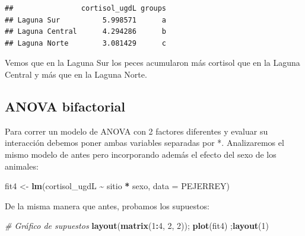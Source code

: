 \documentclass[
]{article}
\newenvironment{Shaded}{\begin{snugshade}}{\end{snugshade}}
\newcommand{\AttributeTok}[1]{\textcolor[rgb]{0.13,0.29,0.53}{#1}}
\newcommand{\CommentTok}[1]{\textcolor[rgb]{0.56,0.35,0.01}{\textit{#1}}}
\newcommand{\DecValTok}[1]{\textcolor[rgb]{0.00,0.00,0.81}{#1}}
\newcommand{\FunctionTok}[1]{\textcolor[rgb]{0.13,0.29,0.53}{\textbf{#1}}}
\newcommand{\NormalTok}[1]{#1}
\newcommand{\OtherTok}[1]{\textcolor[rgb]{0.56,0.35,0.01}{#1}}
\newcommand{\SpecialCharTok}[1]{\textcolor[rgb]{0.81,0.36,0.00}{\textbf{#1}}}
\newcommand{\StringTok}[1]{\textcolor[rgb]{0.31,0.60,0.02}{#1}}
\begin{document}
\begin{Shaded}
\end{Shaded}

\begin{verbatim}
##                cortisol_ugdL groups
## Laguna Sur          5.998571      a
## Laguna Central      4.294286      b
## Laguna Norte        3.081429      c
\end{verbatim}

Vemos que en la Laguna Sur los peces acumularon más cortisol que en la
Laguna Central y más que en la Laguna Norte.

\subsection{ANOVA bifactorial}\label{anova-bifactorial}

Para correr un modelo de ANOVA con 2 factores diferentes y evaluar su
interacción debemos poner ambas variables separadas por *. Analizaremos
el mismo modelo de antes pero incorporando además el efecto del sexo de
los animales:

\begin{Shaded}
\begin{Highlighting}[]
\NormalTok{fit4 }\OtherTok{\textless{}{-}} \FunctionTok{lm}\NormalTok{(cortisol\_ugdL }\SpecialCharTok{\textasciitilde{}}\NormalTok{ sitio }\SpecialCharTok{*}\NormalTok{ sexo, }\AttributeTok{data =}\NormalTok{ PEJERREY)}
\end{Highlighting}
\end{Shaded}

De la misma manera que antes, probamos los supuestos:

\begin{Shaded}
\begin{Highlighting}[]
\CommentTok{\# Gráfico de supuestos}
\FunctionTok{layout}\NormalTok{(}\FunctionTok{matrix}\NormalTok{(}\DecValTok{1}\SpecialCharTok{:}\DecValTok{4}\NormalTok{, }\DecValTok{2}\NormalTok{, }\DecValTok{2}\NormalTok{)); }\FunctionTok{plot}\NormalTok{(fit4) ;}\FunctionTok{layout}\NormalTok{(}\DecValTok{1}\NormalTok{)}
\end{Highlighting}
\end{Shaded}
\end{document}
